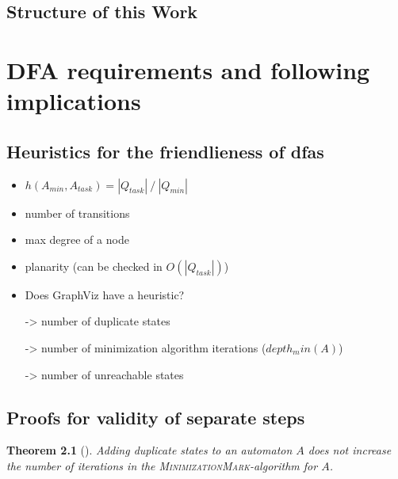 \documentclass[a4paper, oneside, 11pt]{report}
\newtheorem{theorem}{Theorem}
\theoremstyle{definition}
\theoremstyle{remark}
\begin{document}
\section{Structure of this Work}



\chapter{DFA requirements and following implications}

\section{Heuristics for the friendlieness of dfas}

\begin{itemize}
	\item $h(A_{min}, A_{task}) = |Q_{task}|\ /\ |Q_{min}|$
	\item number of transitions
	\item max degree of a node
	\item planarity (can be checked in $O(|Q_{task}|)$)
	\item Does GraphViz have a heuristic?
	\item[->] number of duplicate states
	\item[->] number of minimization algorithm iterations ($depth_min(A)$)
	\item[->] number of unreachable states
\end{itemize}

\section{Proofs for validity of separate steps}

\begin{theorem}[]
	Adding duplicate states to an automaton $A$ does not increase the number of iterations in the \textsc{MinimizationMark}-algorithm for $A$.
\end{theorem}
\end{document}

